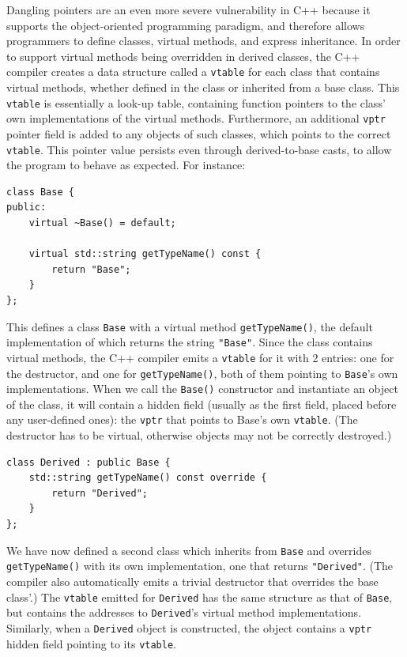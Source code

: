 Dangling pointers are an even more severe vulnerability in C++ because it supports the object-oriented programming paradigm, and therefore allows programmers to define classes, virtual methods, and express inheritance. In order to support virtual methods being overridden in derived classes, the C++ compiler creates a data structure called a \texttt{vtable} for each class that contains virtual methods, whether defined in the class or inherited from a base class. This \texttt{vtable} is essentially a look-up table, containing function pointers to the class' own implementations of the virtual methods. Furthermore, an additional \texttt{vptr} pointer field is added to any objects of such classes, which points to the correct \texttt{vtable}. This pointer value persists even through derived-to-base casts, to allow the program to behave as expected. For instance:

\begin{lstlisting}
class Base {
public:
	virtual ~Base() = default;

	virtual std::string getTypeName() const {
		return "Base";
	}
};
\end{lstlisting}

This defines a class \texttt{Base} with a virtual method \lstinline!getTypeName()!, the default implementation of which returns the string \lstinline!"Base"!. Since the class contains virtual methods, the C++ compiler emits a \texttt{vtable} for it with 2 entries: one for the destructor, and one for \lstinline!getTypeName()!, both of them pointing to \lstinline!Base!'s own implementations. When we call the \lstinline!Base()! constructor and instantiate an object of the class, it will contain a hidden field (usually as the first field, placed before any user-defined ones): the \texttt{vptr} that points to Base's own \texttt{vtable}. (The destructor has to be virtual, otherwise objects may not be correctly destroyed.)

\begin{lstlisting}
class Derived : public Base {
	std::string getTypeName() const override {
		return "Derived";
	}
};
\end{lstlisting}

We have now defined a second class which inherits from \lstinline!Base! and overrides \lstinline!getTypeName()! with its own implementation, one that returns \lstinline!"Derived"!. (The compiler also automatically emits a trivial destructor that overrides the base class'.) The \texttt{vtable} emitted for \lstinline!Derived! has the same structure as that of \lstinline!Base!, but contains the addresses to \lstinline!Derived!'s virtual method implementations. Similarly, when a \lstinline!Derived! object is constructed, the object contains a \texttt{vptr} hidden field pointing to its \texttt{vtable}.

